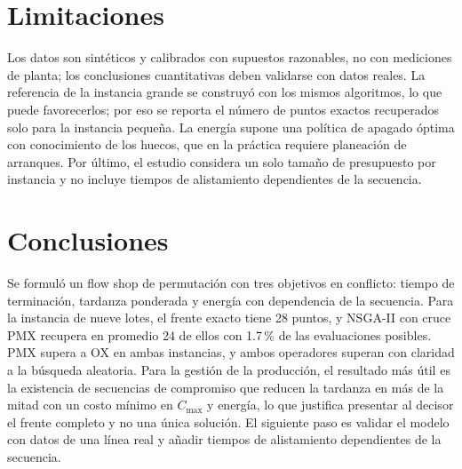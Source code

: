 \documentclass[11pt,a4paper]{article}
\begin{document}
\section{Limitaciones}
Los datos son sintéticos y calibrados con supuestos razonables, no con mediciones de planta; los conclusiones cuantitativas deben validarse con datos reales. La referencia de la instancia grande se construyó con los mismos algoritmos, lo que puede favorecerlos; por eso se reporta el número de puntos exactos recuperados solo para la instancia pequeña. La energía supone una política de apagado óptima con conocimiento de los huecos, que en la práctica requiere planeación de arranques. Por último, el estudio considera un solo tamaño de presupuesto por instancia y no incluye tiempos de alistamiento dependientes de la secuencia.

\section{Conclusiones}
Se formuló un flow shop de permutación con tres objetivos en conflicto: tiempo de terminación, tardanza ponderada y energía con dependencia de la secuencia. Para la instancia de nueve lotes, el frente exacto tiene 28 puntos, y NSGA-II con cruce PMX recupera en promedio 24 de ellos con 1.7\,\% de las evaluaciones posibles. PMX supera a OX en ambas instancias, y ambos operadores superan con claridad a la búsqueda aleatoria. Para la gestión de la producción, el resultado más útil es la existencia de secuencias de compromiso que reducen la tardanza en más de la mitad con un costo mínimo en $C_{\max}$ y energía, lo que justifica presentar al decisor el frente completo y no una única solución. El siguiente paso es validar el modelo con datos de una línea real y añadir tiempos de alistamiento dependientes de la secuencia.



\end{document}
